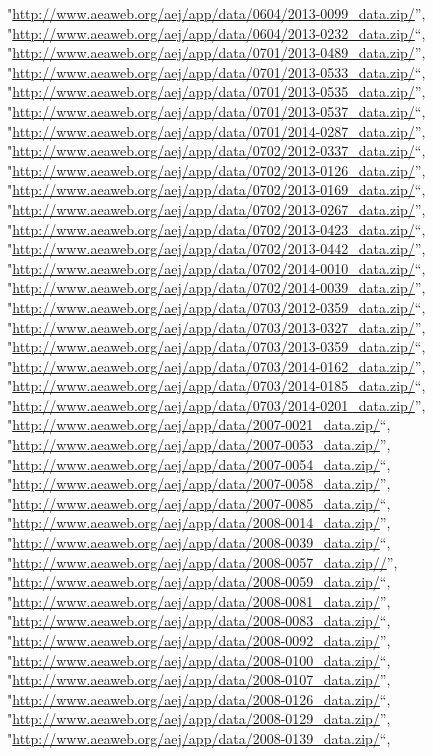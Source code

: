 \documentclass[]{article}
\begin{document}
\begin{itemize}
  "\url{http://www.aeaweb.org/aej/app/data/0604/2013-0099_data.zip/}'',
  "\url{http://www.aeaweb.org/aej/app/data/0604/2013-0232_data.zip/}``,
  "\url{http://www.aeaweb.org/aej/app/data/0701/2013-0489_data.zip/}'',
  "\url{http://www.aeaweb.org/aej/app/data/0701/2013-0533_data.zip/}``,
  "\url{http://www.aeaweb.org/aej/app/data/0701/2013-0535_data.zip/}'',
  "\url{http://www.aeaweb.org/aej/app/data/0701/2013-0537_data.zip/}``,
  "\url{http://www.aeaweb.org/aej/app/data/0701/2014-0287_data.zip/}'',
  "\url{http://www.aeaweb.org/aej/app/data/0702/2012-0337_data.zip/}``,
  "\url{http://www.aeaweb.org/aej/app/data/0702/2013-0126_data.zip/}'',
  "\url{http://www.aeaweb.org/aej/app/data/0702/2013-0169_data.zip/}``,
  "\url{http://www.aeaweb.org/aej/app/data/0702/2013-0267_data.zip/}'',
  "\url{http://www.aeaweb.org/aej/app/data/0702/2013-0423_data.zip/}``,
  "\url{http://www.aeaweb.org/aej/app/data/0702/2013-0442_data.zip/}'',
  "\url{http://www.aeaweb.org/aej/app/data/0702/2014-0010_data.zip/}``,
  "\url{http://www.aeaweb.org/aej/app/data/0702/2014-0039_data.zip/}'',
  "\url{http://www.aeaweb.org/aej/app/data/0703/2012-0359_data.zip/}``,
  "\url{http://www.aeaweb.org/aej/app/data/0703/2013-0327_data.zip/}'',
  "\url{http://www.aeaweb.org/aej/app/data/0703/2013-0359_data.zip/}``,
  "\url{http://www.aeaweb.org/aej/app/data/0703/2014-0162_data.zip/}'',
  "\url{http://www.aeaweb.org/aej/app/data/0703/2014-0185_data.zip/}``,
  "\url{http://www.aeaweb.org/aej/app/data/0703/2014-0201_data.zip/}'',
  "\url{http://www.aeaweb.org/aej/app/data/2007-0021_data.zip/}``,
  "\url{http://www.aeaweb.org/aej/app/data/2007-0053_data.zip/}'',
  "\url{http://www.aeaweb.org/aej/app/data/2007-0054_data.zip/}``,
  "\url{http://www.aeaweb.org/aej/app/data/2007-0058_data.zip/}'',
  "\url{http://www.aeaweb.org/aej/app/data/2007-0085_data.zip/}``,
  "\url{http://www.aeaweb.org/aej/app/data/2008-0014_data.zip/}'',
  "\url{http://www.aeaweb.org/aej/app/data/2008-0039_data.zip/}``,
  "\url{http://www.aeaweb.org/aej/app/data/2008-0057_data.zip//}'',
  "\url{http://www.aeaweb.org/aej/app/data/2008-0059_data.zip/}``,
  "\url{http://www.aeaweb.org/aej/app/data/2008-0081_data.zip/}'',
  "\url{http://www.aeaweb.org/aej/app/data/2008-0083_data.zip/}``,
  "\url{http://www.aeaweb.org/aej/app/data/2008-0092_data.zip/}'',
  "\url{http://www.aeaweb.org/aej/app/data/2008-0100_data.zip/}``,
  "\url{http://www.aeaweb.org/aej/app/data/2008-0107_data.zip/}'',
  "\url{http://www.aeaweb.org/aej/app/data/2008-0126_data.zip/}``,
  "\url{http://www.aeaweb.org/aej/app/data/2008-0129_data.zip/}'',
  "\url{http://www.aeaweb.org/aej/app/data/2008-0139_data.zip/}``,

\end{itemize}
\end{document}
